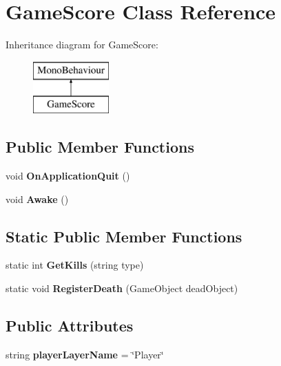 \hypertarget{class_game_score}{}\section{Game\+Score Class Reference}
\label{class_game_score}
Inheritance diagram for Game\+Score\+:\begin{figure}[H]
\begin{center}
\leavevmode
\includegraphics[height=2.000000cm]{class_game_score}
\end{center}
\end{figure}
\subsection*{Public Member Functions}
\begin{DoxyCompactItemize}
\item 
\mbox{\label{class_game_score_a921c37b26a301493f87361dd40d130dc}} 
void {\bfseries On\+Application\+Quit} ()
\item 
\mbox{\label{class_game_score_a8282e475fe4afc3515208f4d90e91ed7}} 
void {\bfseries Awake} ()
\end{DoxyCompactItemize}
\subsection*{Static Public Member Functions}
\begin{DoxyCompactItemize}
\item 
\mbox{\label{class_game_score_af8da758cbf4f649ad6bb1893c5c280e6}} 
static int {\bfseries Get\+Kills} (string type)
\item 
\mbox{\label{class_game_score_a02065966e63ec47f4bcde3f8baa2b3d0}} 
static void {\bfseries Register\+Death} (Game\+Object dead\+Object)
\end{DoxyCompactItemize}
\subsection*{Public Attributes}
\begin{DoxyCompactItemize}
\item 
\mbox{\label{class_game_score_a4887f0dca5309d1a2d505eca6b16412d}} 
string {\bfseries player\+Layer\+Name} = \char`\"{}Player\char`\"{}
\end{DoxyCompactItemize}
